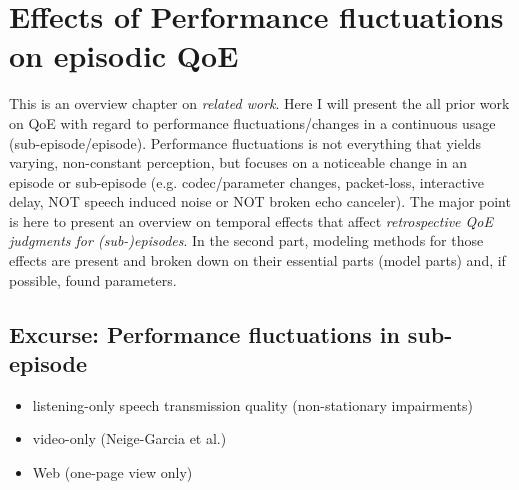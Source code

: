 \chapter{Effects of Performance fluctuations on episodic QoE}\label{chap:04}
\begin{chapter-abstract}
This is an overview chapter on \textit{related work}.
Here I will present the all prior work on QoE with regard to performance fluctuations/changes in a continuous usage (sub-episode/episode).
Performance fluctuations is not everything that yields varying, non-constant perception, but focuses on a noticeable change in an episode or sub-episode (e.g. codec/parameter changes, packet-loss, interactive delay, NOT speech induced noise or NOT broken echo canceler).
The major point is here to present an overview on temporal effects that affect \textit{retrospective QoE judgments for (sub-)episodes}.
In the second part, modeling methods for those effects are present and broken down on their essential parts (model parts) and, if possible, found parameters.






\end{chapter-abstract}


\section{Excurse: Performance fluctuations in sub-episode} %
\begin{itemize}
\item listening-only speech transmission quality (non-stationary impairments)
\item video-only (Neige-Garcia et al.)
\item Web (one-page view only)
\end{itemize}


